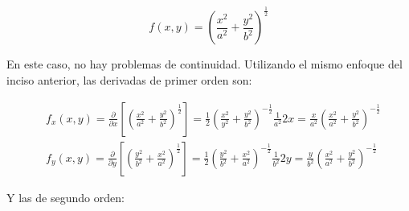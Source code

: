 \documentclass{article}
\begin{document}
\begin{equation}
f(x,y) = \left( \frac{x^2}{a^2} + \frac{y^2}{b^2} \right)^{\frac{1}{2}}
\end{equation}

En este caso, no hay problemas de continuidad. Utilizando el mismo enfoque del inciso anterior, las derivadas de primer orden son:

\begin{subequations}
\begin{align}
& f_x(x,y) = \frac{\partial}{\partial x} \left[ \left( \frac{x^2}{a^2} + \frac{y^2}{b^2} \right)^\frac{1}{2} \right] = \frac{1}{2} \left( \frac{x^2}{y^2} + \frac{y^2}{b^2} \right)^{-\frac{1}{2}} \frac{1}{a^2} 2x = \frac{x}{a^2} \left( \frac{x^2}{a^2} + \frac{y^2}{b^2} \right)^{-\frac{1}{2}} \\
& f_y(x,y) = \frac{\partial}{\partial y} \left[ \left( \frac{y^2}{b^2} + \frac{x^2}{a^2} \right)^\frac{1}{2} \right] = \frac{1}{2} \left( \frac{y^2}{b^2} + \frac{x^2}{a^2} \right)^{-\frac{1}{2}} \frac{1}{b^2} 2y = \frac{y}{b^2} \left( \frac{x^2}{a^2} + \frac{y^2}{b^2} \right)^{-\frac{1}{2}}
\end{align}
\end{subequations}

Y las de segundo orden:
\end{document}
